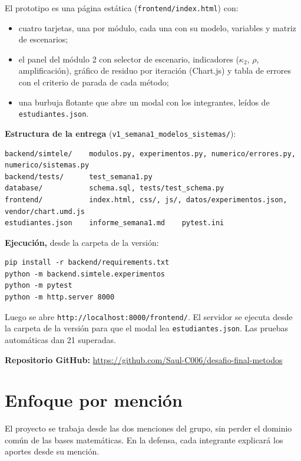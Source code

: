 \documentclass[
  11pt,
  letterpaper,
]{article}
\providecommand{\tightlist}{%
  \setlength{\itemsep}{0pt}\setlength{\parskip}{0pt}}
\begin{document}
El prototipo es una página estática (\texttt{frontend/index.html}) con:

\begin{itemize}
\tightlist
\item
  cuatro tarjetas, una por módulo, cada una con su modelo, variables y
  matriz de escenarios;
\item
  el panel del módulo 2 con selector de escenario, indicadores
  (\(\kappa_2\), \(\rho\), amplificación), gráfico de residuo por
  iteración (Chart.js) y tabla de errores con el criterio de parada de
  cada método;
\item
  una burbuja flotante que abre un modal con los integrantes, leídos de
  \texttt{estudiantes.json}.
\end{itemize}

\textbf{Estructura de la entrega}
(\texttt{v1\_semana1\_modelos\_sistemas/}):

\begin{verbatim}
backend/simtele/    modulos.py, experimentos.py, numerico/errores.py, numerico/sistemas.py
backend/tests/      test_semana1.py
database/           schema.sql, tests/test_schema.py
frontend/           index.html, css/, js/, datos/experimentos.json, vendor/chart.umd.js
estudiantes.json    informe_semana1.md    pytest.ini
\end{verbatim}

\textbf{Ejecución,} desde la carpeta de la versión:

\begin{verbatim}
pip install -r backend/requirements.txt
python -m backend.simtele.experimentos
python -m pytest
python -m http.server 8000
\end{verbatim}

Luego se abre \texttt{http://localhost:8000/frontend/}. El servidor se
ejecuta desde la carpeta de la versión para que el modal lea
\texttt{estudiantes.json}. Las pruebas automáticas dan 21 superadas.

\textbf{Repositorio GitHub:}
\url{https://github.com/Saul-C006/desafio-final-metodos}

\hypertarget{menciones}{%
\section{Enfoque por mención}\label{menciones}}

El proyecto se trabaja desde las dos menciones del grupo, sin perder el
dominio común de las bases matemáticas. En la defensa, cada integrante
explicará los aportes desde su mención.
\end{document}
